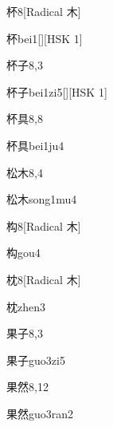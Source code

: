 \begin{entry}{杯}{8}[Radical 木]
  \begin{phonetics}{杯}{bei1}[][HSK 1]
  \end{phonetics}
\end{entry}

\begin{entry}{杯子}{8,3}
  \begin{phonetics}{杯子}{bei1zi5}[][HSK 1]
  \end{phonetics}
\end{entry}

\begin{entry}{杯具}{8,8}
  \begin{phonetics}{杯具}{bei1ju4}
  \end{phonetics}
\end{entry}

\begin{entry}{松木}{8,4}
  \begin{phonetics}{松木}{song1mu4}
  \end{phonetics}
\end{entry}

\begin{entry}{构}{8}[Radical ⽊]
  \begin{phonetics}{构}{gou4}
  \end{phonetics}
\end{entry}

\begin{entry}{枕}{8}[Radical 木]
  \begin{phonetics}{枕}{zhen3}
  \end{phonetics}
\end{entry}

\begin{entry}{果子}{8,3}
  \begin{phonetics}{果子}{guo3zi5}
  \end{phonetics}
\end{entry}

\begin{entry}{果然}{8,12}
  \begin{phonetics}{果然}{guo3ran2}
  \end{phonetics}
\end{entry}

